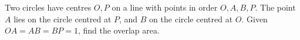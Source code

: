 Two circles have centres $O,P$ on a line with points in order $O,A,B,P$. The point $A$ lies on the circle centred at $P$, and $B$ on the circle centred at $O$. Given $OA=AB=BP=1$, find the overlap area.
